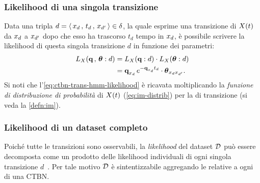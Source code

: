 \subsubsection{Likelihood di una singola transizione}
\label{subsec:ctbn-likelihood-single-trans-single-hmp}
Data una tripla $d=\langle \,\mathnormal{x}_{d}\,,\,t_d\,,\,\mathnormal{x}_{d^{\prime}}\,\rangle\in\delta$, la quale esprime una transizione di $\mathnormal{X}(t)$ da $\mathnormal{x}_d$ a $\mathnormal{x}_{d^{\prime}}$ dopo che esso ha trascorso $t_d$ tempo in $\mathnormal{x}_d$, è possibile scrivere la likelihood di questa singola transizione $d$ in funzione dei parametri:
\begin{equation}
\label{eq:ctbn-trans-hmm-likelihood}
\begin{split}
L_{\mathnormal{X}}(\boldsymbol{\textbf{\text{q}}}\,,\,\boldsymbol{\textbf{\text{$\theta$}}}:d) &= L_{\mathnormal{X}}(\boldsymbol{\textbf{\text{q}}}:d) \cdot L_{\mathnormal{X}}(\boldsymbol{\textbf{\text{$\theta$}}}:d) \\
&= \boldsymbol{\textbf{\text{q}}}_{\mathnormal{x}_d}\,e^{-\boldsymbol{\textbf{\text{q}}}_{\mathnormal{x}_d}t_d} \cdot \boldsymbol{\textbf{\text{$\theta$}}}_{\mathnormal{x}_{d}\mathnormal{x}_{d^{\prime}}}\text{.}
\end{split}
\end{equation}
Si noti che l'\autoref{eq:ctbn-trans-hmm-likelihood} è ricavata moltiplicando la \emph{funzione di distribuzione di probabilità} di $\mathnormal{X}(t)$ (\autoref{eq:im-distrib}) per la \emph{} di transizione (si veda la \autoref{defn:im}).

\subsubsection{Likelihood di un dataset completo}
\label{subsec:ctbn-likelihood-dataset}
Poiché tutte le transizioni sono osservabili, la \emph{likelihood} del dataset $\mathcal{D}$ può essere decomposta come un prodotto delle likelihood individuali di ogni singola transizione $d$~\citep[si veda][3]{Nodelman2002}. Per tale motivo $\mathcal{D}$ è sintentizzabile aggregando le \emph{\keyword{\stats{}}} relative a ogni \mprocess*{} \cond*{} di una \acs{CTBN}.

